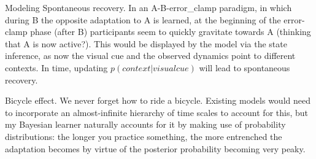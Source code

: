 \documentclass{report}
\begin{document}
\begin{chapter}{Modeling}
Spontaneous recovery. In an A-B-error\_clamp paradigm, in which during B the
opposite adaptation to A is learned, at the beginning of the error-clamp phase
(after B) participants seem to quickly gravitate towards A (thinking that A is
now active?). This would be displayed by the model via the state inference, as
now the visual cue and the observed dynamics point to different contexts. In
time, updating $p(context | visual cue)$ will lead to spontaneous recovery.

Bicycle effect. We never forget how to ride a bicycle. Existing models would
need to incorporate an almost-infinite hierarchy of time scales to account for
this, but my Bayesian learner naturally accounts for it by making use of
probability distributions: the longer you practice something, the more
entrenched the adaptation becomes by virtue of the posterior probability
becoming very peaky.


\end{chapter}

\end{document}
